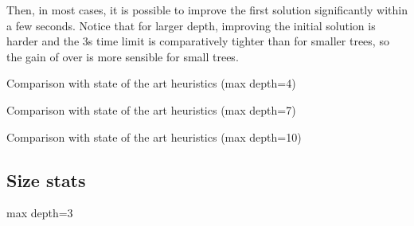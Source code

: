 \documentclass{article}
\begin{document}
Then, in most cases, it is possible to improve the first solution significantly within a few seconds. Notice that for larger depth, improving the initial solution is harder and the 3s time limit is comparatively tighter than for smaller trees, so the gain of \budalg over \cart is more sensible for small trees.





\begin{table}[htbp]
\begin{center}
\begin{normalsize}
\tabcolsep=5pt

\end{normalsize}
\end{center}
\caption{\label{tab:f4} Comparison with state of the art heuristics (max depth=4)}
\end{table}

\begin{table}[htbp]
\begin{center}
\begin{normalsize}
\tabcolsep=5pt

\end{normalsize}
\end{center}
\caption{\label{tab:f7} Comparison with state of the art heuristics (max depth=7)}
\end{table}

\begin{table}[htbp]
\begin{center}
\begin{normalsize}
\tabcolsep=5pt

\end{normalsize}
\end{center}
\caption{\label{tab:f10} Comparison with state of the art heuristics (max depth=10)}
\end{table}


\subsection*{Size stats}


\begin{table}[htbp]
\begin{center}
\begin{normalsize}
\tabcolsep=3pt

\end{normalsize}
\end{center}
\caption{\label{tab:s3} max depth=3}
\end{table}
\end{document}

